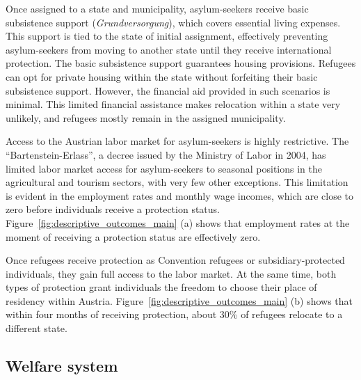 Once assigned to a state and municipality, asylum-seekers receive basic subsistence support (\textit{Grundversorgung}), which covers essential living expenses. This support is tied to the state of initial assignment, effectively preventing asylum-seekers from moving to another state until they receive international protection. The basic subsistence support guarantees housing provisions. Refugees can opt for private housing within the state without forfeiting their basic subsistence support. However, the financial aid provided in such scenarios is minimal. This limited financial assistance makes relocation within a state very unlikely, and refugees mostly remain in the assigned municipality.

Access to the Austrian labor market for asylum-seekers is highly restrictive. The ``Barten\-stein-Er\-lass'', a decree issued by the Ministry of Labor in 2004, has limited labor market access for asylum-seekers to seasonal positions in the agricultural and tourism sectors, with very few other exceptions. This limitation is evident in the employment rates and monthly wage incomes, which are close to zero before individuals receive a protection status. Figure~\ref{fig:descriptive_outcomes_main} (a) shows that employment rates at the moment of receiving a protection status are effectively zero. 

Once refugees receive protection as Convention refugees or subsidiary-protected individuals, they gain full access to the labor market. 
At the same time, both types of protection grant individuals the freedom to choose their place of residency within Austria. Figure~\ref{fig:descriptive_outcomes_main} (b) shows that within four months of receiving protection, about 30\% of refugees relocate to a different state.


\subsection*{Welfare system}

